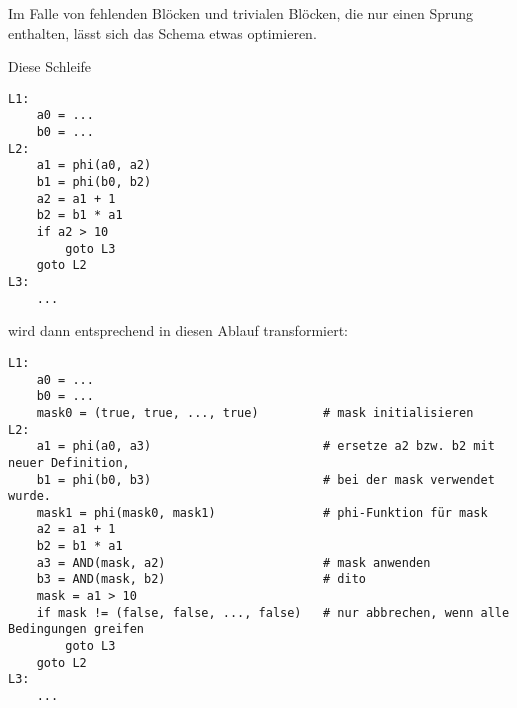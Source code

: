\documentclass[a4paper,10pt]{article}
\begin{document}
Im Falle von fehlenden Blöcken und trivialen Blöcken, die nur einen Sprung enthalten, lässt sich das Schema etwas
optimieren.

Diese Schleife

\begin{verbatim}
L1:
    a0 = ...
    b0 = ...
L2:
    a1 = phi(a0, a2)
    b1 = phi(b0, b2)
    a2 = a1 + 1
    b2 = b1 * a1
    if a2 > 10
        goto L3
    goto L2
L3: 
    ...
\end{verbatim}

wird dann entsprechend in diesen Ablauf transformiert:

\begin{verbatim}
L1:
    a0 = ...
    b0 = ...
    mask0 = (true, true, ..., true)         # mask initialisieren
L2:
    a1 = phi(a0, a3)                        # ersetze a2 bzw. b2 mit neuer Definition, 
    b1 = phi(b0, b3)                        # bei der mask verwendet wurde.
    mask1 = phi(mask0, mask1)               # phi-Funktion für mask
    a2 = a1 + 1
    b2 = b1 * a1
    a3 = AND(mask, a2)                      # mask anwenden
    b3 = AND(mask, b2)                      # dito
    mask = a1 > 10
    if mask != (false, false, ..., false)   # nur abbrechen, wenn alle Bedingungen greifen
        goto L3
    goto L2
L3: 
    ...
\end{verbatim}





\end{document}
